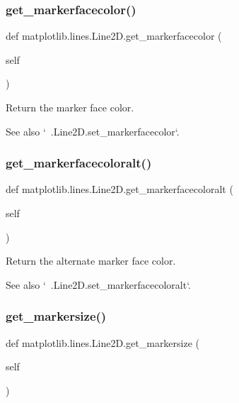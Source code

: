 \subsubsection{\texorpdfstring{get\+\_\+markerfacecolor()}{get\_markerfacecolor()}}
{\footnotesize\ttfamily def matplotlib.\+lines.\+Line2\+D.\+get\+\_\+markerfacecolor (\begin{DoxyParamCaption}\item[{}]{self }\end{DoxyParamCaption})}

\begin{DoxyVerb}Return the marker face color.

See also `~.Line2D.set_markerfacecolor`.
\end{DoxyVerb}
 \mbox{\label{classmatplotlib_1_1lines_1_1Line2D_a86642aae4e7a0e982b240c2ba24133a1}} 
\subsubsection{\texorpdfstring{get\+\_\+markerfacecoloralt()}{get\_markerfacecoloralt()}}
{\footnotesize\ttfamily def matplotlib.\+lines.\+Line2\+D.\+get\+\_\+markerfacecoloralt (\begin{DoxyParamCaption}\item[{}]{self }\end{DoxyParamCaption})}

\begin{DoxyVerb}Return the alternate marker face color.

See also `~.Line2D.set_markerfacecoloralt`.
\end{DoxyVerb}
 \mbox{\label{classmatplotlib_1_1lines_1_1Line2D_ae09ec84404b7788ddd8c8cd8ff6e2596}} 
\subsubsection{\texorpdfstring{get\+\_\+markersize()}{get\_markersize()}}
{\footnotesize\ttfamily def matplotlib.\+lines.\+Line2\+D.\+get\+\_\+markersize (\begin{DoxyParamCaption}\item[{}]{self }\end{DoxyParamCaption})}

